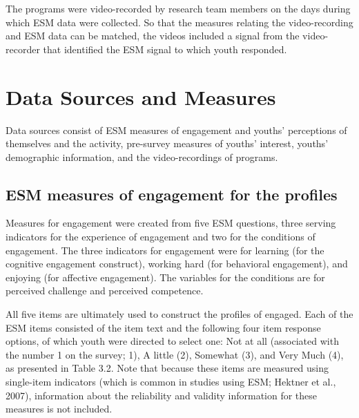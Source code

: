 \documentclass[]{book}
\theoremstyle{definition}
\theoremstyle{definition}
\theoremstyle{definition}
\theoremstyle{remark}
\begin{document}
The programs were video-recorded by research team members on the days
during which ESM data were collected. So that the measures relating the
video-recording and ESM data can be matched, the videos included a
signal from the video-recorder that identified the ESM signal to which
youth responded.

\section{Data Sources and Measures}\label{data-sources-and-measures}

Data sources consist of ESM measures of engagement and youths'
perceptions of themselves and the activity, pre-survey measures of
youths' interest, youths' demographic information, and the
video-recordings of programs.

\subsection{ESM measures of engagement for the
profiles}\label{esm-measures-of-engagement-for-the-profiles}

Measures for engagement were created from five ESM questions, three
serving indicators for the experience of engagement and two for the
conditions of engagement. The three indicators for engagement were for
learning (for the cognitive engagement construct), working hard (for
behavioral engagement), and enjoying (for affective engagement). The
variables for the conditions are for perceived challenge and perceived
competence.

All five items are ultimately used to construct the profiles of engaged.
Each of the ESM items consisted of the item text and the following four
item response options, of which youth were directed to select one: Not
at all (associated with the number 1 on the survey; 1), A little (2),
Somewhat (3), and Very Much (4), as presented in Table 3.2. Note that
because these items are measured using single-item indicators (which is
common in studies using ESM; Hektner et al., 2007), information about
the reliability and validity information for these measures is not
included.

\begin{table}

\caption{\label{tab:unnamed-chunk-4}ESM measures for profiles}
\centering
{}
\end{table}
\end{document}
